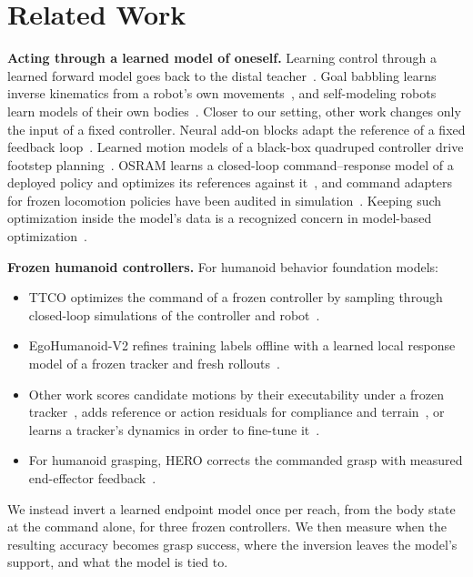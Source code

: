 \documentclass[conference]{IEEEtran}
\begin{document}
\section{Related Work}
\textbf{Acting through a learned model of oneself.} Learning control through a learned forward model goes back to the distal teacher~\cite{jordan1992}. Goal babbling learns inverse kinematics from a robot's own movements~\cite{rolf2010,saggriac}, and self-modeling robots learn models of their own bodies~\cite{bongard2006}. Closer to our setting, other work changes only the input of a fixed controller. Neural add-on blocks adapt the reference of a fixed feedback loop~\cite{zhou2017dnn}. Learned motion models of a black-box quadruped controller drive footstep planning~\cite{taouil2023}. OSRAM learns a closed-loop command--response model of a deployed policy and optimizes its references against it~\cite{osram}, and command adapters for frozen locomotion policies have been audited in simulation~\cite{li2026audit}. Keeping such optimization inside the model's data is a recognized concern in model-based optimization~\cite{mins,lagrassa2024,osram}.

\textbf{Frozen humanoid controllers.} For humanoid behavior foundation models:
\begin{itemize}
\item TTCO optimizes the command of a frozen controller by sampling through closed-loop simulations of the controller and robot~\cite{ttco}.
\item EgoHumanoid-V2 refines training labels offline with a learned local response model of a frozen tracker and fresh rollouts~\cite{egohumanoidv2}.
\item Other work scores candidate motions by their executability under a frozen tracker~\cite{s3,texedo}, adds reference or action residuals for compliance and terrain~\cite{ila,graft}, or learns a tracker's dynamics in order to fine-tune it~\cite{humanoidndm}.
\item For humanoid grasping, HERO corrects the commanded grasp with measured end-effector feedback~\cite{hero}.
\end{itemize}
We instead invert a learned endpoint model once per reach, from the body state at the command alone, for three frozen controllers. We then measure when the resulting accuracy becomes grasp success, where the inversion leaves the model's support, and what the model is tied to.
\end{document}
